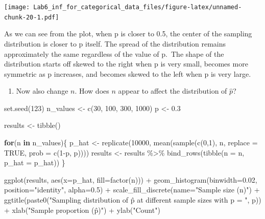 \documentclass[
]{article}
\newenvironment{Shaded}{\begin{snugshade}}{\end{snugshade}}
\newcommand{\AttributeTok}[1]{\textcolor[rgb]{0.77,0.63,0.00}{#1}}
\newcommand{\ConstantTok}[1]{\textcolor[rgb]{0.00,0.00,0.00}{#1}}
\newcommand{\ControlFlowTok}[1]{\textcolor[rgb]{0.13,0.29,0.53}{\textbf{#1}}}
\newcommand{\DecValTok}[1]{\textcolor[rgb]{0.00,0.00,0.81}{#1}}
\newcommand{\FloatTok}[1]{\textcolor[rgb]{0.00,0.00,0.81}{#1}}
\newcommand{\FunctionTok}[1]{\textcolor[rgb]{0.00,0.00,0.00}{#1}}
\newcommand{\NormalTok}[1]{#1}
\newcommand{\OtherTok}[1]{\textcolor[rgb]{0.56,0.35,0.01}{#1}}
\newcommand{\SpecialCharTok}[1]{\textcolor[rgb]{0.00,0.00,0.00}{#1}}
\newcommand{\StringTok}[1]{\textcolor[rgb]{0.31,0.60,0.02}{#1}}
\providecommand{\tightlist}{%
  \setlength{\itemsep}{0pt}\setlength{\parskip}{0pt}}
\begin{document}
\texttt{[image: Lab6\_inf\_for\_categorical\_data\_files/figure-latex/unnamed-chunk-20-1.pdf]}

As we can see from the plot, when p is closer to 0.5, the center of the
sampling distribution is closer to p itself. The spread of the
distribution remains approximately the same regardless of the value of
p.~The shape of the distribution starts off skewed to the right when p
is very small, becomes more symmetric as p increases, and becomes skewed
to the left when p is very large.

\begin{enumerate}
\def\labelenumi{\arabic{enumi}.}
\setcounter{enumi}{7}
\tightlist
\item
  Now also change \(n\). How does \(n\) appear to affect the
  distribution of \(\hat{p}\)?
\end{enumerate}

\begin{Shaded}
\begin{Highlighting}[]
\FunctionTok{set.seed}\NormalTok{(}\DecValTok{123}\NormalTok{)}
\NormalTok{n\_values }\OtherTok{\textless{}{-}} \FunctionTok{c}\NormalTok{(}\DecValTok{30}\NormalTok{, }\DecValTok{100}\NormalTok{, }\DecValTok{300}\NormalTok{, }\DecValTok{1000}\NormalTok{)}
\NormalTok{p }\OtherTok{\textless{}{-}} \FloatTok{0.3}

\NormalTok{results }\OtherTok{\textless{}{-}} \FunctionTok{tibble}\NormalTok{()}

\ControlFlowTok{for}\NormalTok{(n }\ControlFlowTok{in}\NormalTok{ n\_values)\{}
\NormalTok{  p\_hat }\OtherTok{\textless{}{-}} \FunctionTok{replicate}\NormalTok{(}\DecValTok{10000}\NormalTok{, }\FunctionTok{mean}\NormalTok{(}\FunctionTok{sample}\NormalTok{(}\FunctionTok{c}\NormalTok{(}\DecValTok{0}\NormalTok{,}\DecValTok{1}\NormalTok{), n, }\AttributeTok{replace =} \ConstantTok{TRUE}\NormalTok{, }\AttributeTok{prob =} \FunctionTok{c}\NormalTok{(}\DecValTok{1}\SpecialCharTok{{-}}\NormalTok{p, p))))}
\NormalTok{  results }\OtherTok{\textless{}{-}}\NormalTok{ results }\SpecialCharTok{\%\textgreater{}\%} 
    \FunctionTok{bind\_rows}\NormalTok{(}\FunctionTok{tibble}\NormalTok{(}\AttributeTok{n =}\NormalTok{ n, }\AttributeTok{p\_hat =}\NormalTok{ p\_hat))}
\NormalTok{\}}

\FunctionTok{ggplot}\NormalTok{(results, }\FunctionTok{aes}\NormalTok{(}\AttributeTok{x=}\NormalTok{p\_hat, }\AttributeTok{fill=}\FunctionTok{factor}\NormalTok{(n))) }\SpecialCharTok{+} 
  \FunctionTok{geom\_histogram}\NormalTok{(}\AttributeTok{binwidth=}\FloatTok{0.02}\NormalTok{, }\AttributeTok{position=}\StringTok{"identity"}\NormalTok{, }\AttributeTok{alpha=}\FloatTok{0.5}\NormalTok{) }\SpecialCharTok{+}
  \FunctionTok{scale\_fill\_discrete}\NormalTok{(}\AttributeTok{name=}\StringTok{"Sample size (n)"}\NormalTok{) }\SpecialCharTok{+} 
  \FunctionTok{ggtitle}\NormalTok{(}\FunctionTok{paste0}\NormalTok{(}\StringTok{"Sampling distribution of p̂ at different sample sizes with p = "}\NormalTok{, p)) }\SpecialCharTok{+}
  \FunctionTok{xlab}\NormalTok{(}\StringTok{"Sample proportion (p̂)"}\NormalTok{) }\SpecialCharTok{+} \FunctionTok{ylab}\NormalTok{(}\StringTok{"Count"}\NormalTok{)}
\end{Highlighting}
\end{Shaded}
\end{document}
